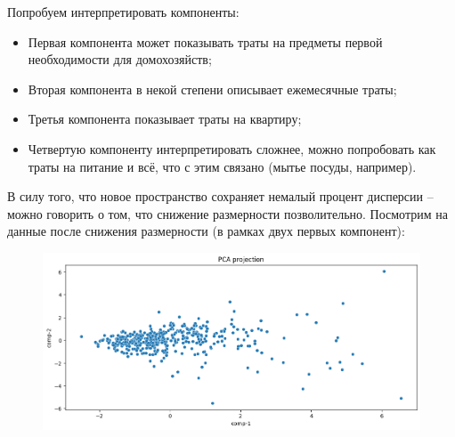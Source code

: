 \documentclass[12pt]{report}
\begin{document}
  Попробуем интерпретировать компоненты:
  \begin{itemize}
    \item Первая компонента может показывать траты на предметы первой необходимости для домохозяйств;
    \item Вторая компонента в некой степени описывает ежемесячные траты;
    \item Третья компонента показывает траты на квартиру;
    \item Четвертую компоненту интерпретировать сложнее, можно попробовать как траты на питание и всё, что с этим связано (мытье посуды, например).
  \end{itemize}
  В силу того, что новое пространство сохраняет немалый процент дисперсии -- можно говорить о том, что снижение размерности позволительно. Посмотрим на данные после снижения размерности (в рамках двух первых компонент):
  \begin{figure}[H]
    \centering
    \includegraphics[scale=0.38]{./imgs/pca1.png}
  \end{figure}
\end{document}
